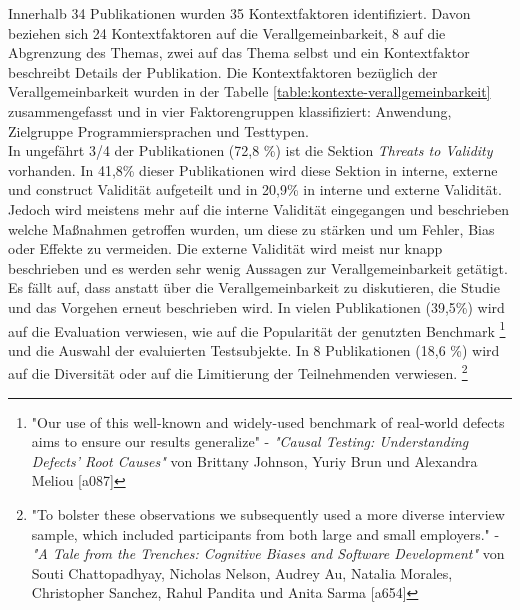 Innerhalb 34 Publikationen wurden 35 Kontextfaktoren identifiziert.
Davon beziehen sich 24 Kontextfaktoren auf die Verallgemeinbarkeit,
8 auf die Abgrenzung des Themas, zwei auf das Thema selbst und ein Kontextfaktor beschreibt Details der Publikation.
Die Kontextfaktoren bezüglich der Verallgemeinbarkeit wurden in der Tabelle \ref{table:kontexte-verallgemeinbarkeit} zusammengefasst und in vier Faktorengruppen klassifiziert: Anwendung, Zielgruppe Programmiersprachen und Testtypen.
\\




\clearpage
In ungefährt 3/4 der Publikationen (72,8 \%) ist die Sektion \textit{Threats to Validity} vorhanden. In 41,8\% dieser Publikationen wird diese Sektion in interne, externe und construct Validität aufgeteilt und in 20,9\% in interne und externe Validität. Jedoch wird meistens mehr auf die interne Validität eingegangen und beschrieben welche Maßnahmen getroffen wurden, um diese zu stärken und um Fehler, Bias oder Effekte zu vermeiden. Die externe Validität wird meist nur knapp beschrieben und es werden sehr wenig Aussagen zur Verallgemeinbarkeit getätigt. \\
Es fällt auf, dass anstatt über die Verallgemeinbarkeit zu diskutieren, die Studie und das Vorgehen erneut beschrieben wird. In vielen Publikationen (39,5\%) wird auf die Evaluation verwiesen, wie auf die Popularität der genutzten Benchmark
\footnote{ "Our use of this well-known and widely-used benchmark of real-world defects aims to ensure our results generalize" - \textit{"Causal Testing: Understanding Defects’ Root Causes"} von Brittany Johnson, Yuriy Brun und Alexandra Meliou [a087]}
und die Auswahl der evaluierten Testsubjekte.
In 8 Publikationen (18,6 \%) wird auf die Diversität oder auf die Limitierung der Teilnehmenden verwiesen.
\footnote{ "To bolster these observations we subsequently used a more diverse interview sample, which included participants from both large and small employers." - \textit{"A Tale from the Trenches: Cognitive Biases and Software Development"} von Souti Chattopadhyay, Nicholas Nelson, Audrey Au, Natalia Morales, Christopher Sanchez, Rahul Pandita und Anita Sarma [a654]} \\


\clearpage

